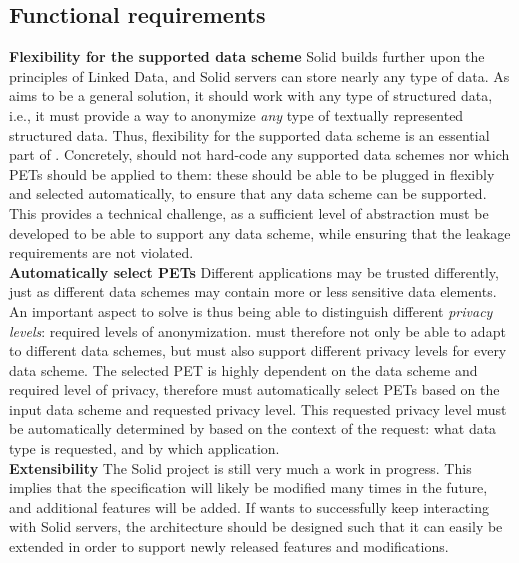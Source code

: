 \subsection{Functional requirements}
\noindent \textbf{Flexibility for the supported data scheme} Solid builds further upon the principles of Linked Data, and Solid servers can store nearly any type of data. As \middleware{} aims to be a general solution, it should work with any type of structured data, i.e., it must provide a way to anonymize \textit{any} type of textually represented structured data. Thus, flexibility for the supported data scheme is an essential part of \middleware{}. Concretely, \middleware{} should not hard-code any supported data schemes nor which \gls{PETs} should be applied to them: these should be able to be plugged in flexibly and selected automatically, to ensure that any data scheme can be supported. This provides a technical challenge, as a sufficient level of abstraction must be developed to be able to support any data scheme, while ensuring that the leakage requirements are not violated. \\

\noindent \textbf{Automatically select \gls{PETs}} Different applications may be trusted differently, just as different data schemes may contain more or less sensitive data elements. An important aspect to solve is thus being able to distinguish different \textit{privacy levels}: required levels of anonymization. \middleware{} must therefore not only be able to adapt to different data schemes, but must also support different privacy levels for every data scheme. The selected PET is highly dependent on the data scheme and required level of privacy, therefore \middleware{} must automatically select \gls{PETs} based on the input data scheme and requested privacy level. This requested privacy level must be automatically determined by \middleware{} based on the context of the request: what data type is requested, and by which application. \\

\noindent \textbf{Extensibility} The Solid project is still very much a work in progress. This implies that the specification will likely be modified many times in the future, and additional features will be added. If \middleware{} wants to successfully keep interacting with Solid servers, the architecture should be designed such that it can easily be extended in order to support newly released features and modifications. \\

